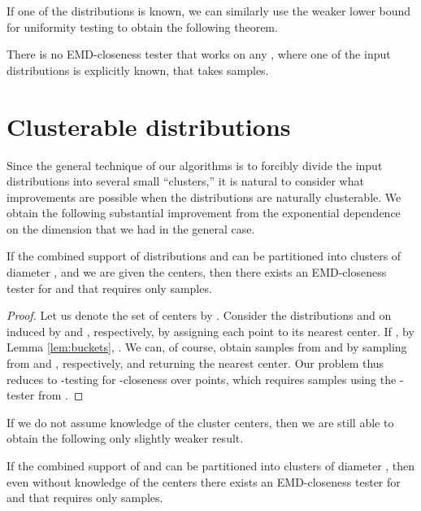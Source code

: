 \documentclass[11pt]{article}
\begin{document}
If one of the distributions is known, we can similarly
use the weaker  lower bound for uniformity testing to obtain the
following theorem.

\begin{theorem}
	There is no EMD-closeness tester that works on any , where
	one of the input distributions is explicitly known, that takes 
	samples.
\end{theorem}



\section{Clusterable distributions}

Since the general technique of our algorithms is to forcibly divide the input
distributions into several small ``clusters,'' it is natural to consider what
improvements are possible when the distributions are naturally clusterable.
We obtain the following substantial improvement from the exponential dependence
on the dimension  that we had in the general case.

\begin{theorem}\label{thm:knowncenters}
	If the combined support of distributions  and  can be partitioned into
	 clusters of diameter , and we are given the  centers, then
	there exists an EMD-closeness tester for  and  that requires
	only  samples.
\end{theorem}

\begin{proof}
Let us denote the set of centers by . Consider the
distributions  and  on  induced by  and , respectively,
by assigning each point to its nearest center. If ,
by Lemma \ref{lem:buckets}, . We can,
of course, obtain samples from  and  by sampling from  and , respectively, and
returning the nearest center. Our problem thus reduces to -testing for
-closeness over  points, which requires
 samples using the -tester from
\cite{L1tester}.
\end{proof}

If we do not assume knowledge of the cluster centers, then we are still able to
obtain the following only slightly weaker result.

\begin{theorem}\label{thm:unknowncenters}
	If the combined support of  and  can be partitioned into  clusters
	of diameter , then even without knowledge of the centers there exists
	an EMD-closeness tester for  and  that requires only
	 samples.
\end{theorem}
\end{document}
